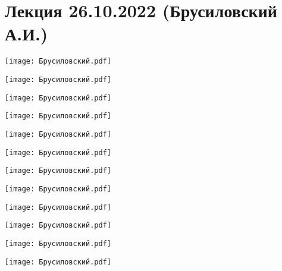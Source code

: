 \documentclass[main.tex]{subfiles}
\begin{document}
\section{Лекция 26.10.2022 (Брусиловский А.И.)}

\begin{center}
\texttt{[image: Брусиловский.pdf]}
\end{center}

\begin{center}
\texttt{[image: Брусиловский.pdf]}
\end{center}

\begin{center}
\texttt{[image: Брусиловский.pdf]}
\end{center}

\begin{center}
\texttt{[image: Брусиловский.pdf]}
\end{center}

\begin{center}
\texttt{[image: Брусиловский.pdf]}
\end{center}

\begin{center}
\texttt{[image: Брусиловский.pdf]}
\end{center}

\begin{center}
\texttt{[image: Брусиловский.pdf]}
\end{center}

\begin{center}
\texttt{[image: Брусиловский.pdf]}
\end{center}

\begin{center}
\texttt{[image: Брусиловский.pdf]}
\end{center}

\begin{center}
\texttt{[image: Брусиловский.pdf]}
\end{center}

\begin{center}
\texttt{[image: Брусиловский.pdf]}
\end{center}

\begin{center}
\texttt{[image: Брусиловский.pdf]}
\end{center}
\end{document}
